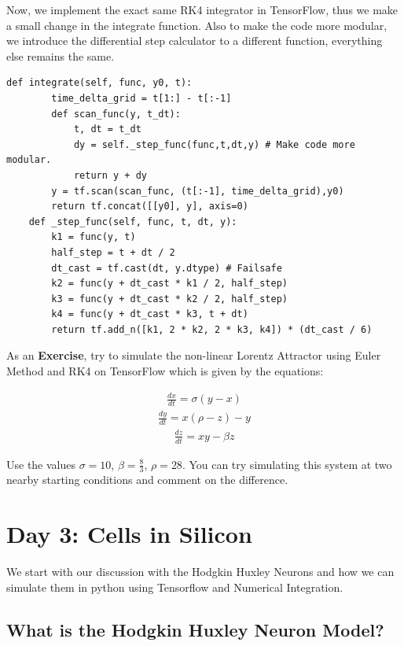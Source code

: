\documentclass[10pt,letterpaper]{article}
\begin{document}
Now, we implement the exact same RK4 integrator in TensorFlow, thus we make a small change in the integrate function. Also to make the code more modular, we introduce the differential step calculator to a different function, everything else remains the same.

\begin{verbatim}
def integrate(self, func, y0, t): 
        time_delta_grid = t[1:] - t[:-1]
        def scan_func(y, t_dt): 
            t, dt = t_dt
            dy = self._step_func(func,t,dt,y) # Make code more modular.
            return y + dy
        y = tf.scan(scan_func, (t[:-1], time_delta_grid),y0)
        return tf.concat([[y0], y], axis=0)
    def _step_func(self, func, t, dt, y):
        k1 = func(y, t)
        half_step = t + dt / 2
        dt_cast = tf.cast(dt, y.dtype) # Failsafe
        k2 = func(y + dt_cast * k1 / 2, half_step)
        k3 = func(y + dt_cast * k2 / 2, half_step)
        k4 = func(y + dt_cast * k3, t + dt)
        return tf.add_n([k1, 2 * k2, 2 * k3, k4]) * (dt_cast / 6)
\end{verbatim}

As an \textbf{Exercise}, try to simulate the non-linear Lorentz Attractor using Euler Method and RK4 on TensorFlow which is given by the equations:

\begin{eqnarray}\frac{dx}{dt}=\sigma(y-x) \end{eqnarray}
\begin{eqnarray}\frac{dy}{dt}=x(\rho-z)-y \end{eqnarray}
\begin{eqnarray}\frac{dz}{dt}=xy-\beta z \end{eqnarray}

Use the values $\sigma =10$, $\beta =\frac{8}{3}$, $\rho =28$. You can try simulating this system at two nearby starting conditions and comment on the difference.

\section*{Day 3: Cells in Silicon}

We start with our discussion with the Hodgkin Huxley Neurons and how we can simulate them in python using Tensorflow and Numerical Integration.

\subsection*{What is the Hodgkin Huxley Neuron Model?}
\end{document}

